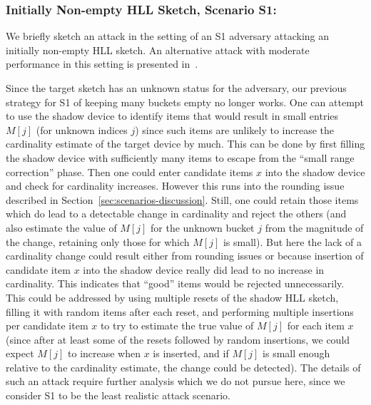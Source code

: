 \documentclass[sigconf, anonymous, dvipsnames]{acmart} %
\begin{document}
\subsubsection{Initially Non-empty HLL Sketch, Scenario S1:} 

We briefly sketch an attack in the setting of an S1 adversary attacking an initially non-empty HLL sketch. An alternative attack with moderate performance in this setting is presented in~\cite{hllvuln}.

Since the target sketch has an unknown status for the adversary, our previous strategy for S1 of keeping many buckets empty no longer works. One can attempt to use the shadow device to identify items that would result in small entries $M[j]$ (for unknown indices $j$) since such items are unlikely to increase the cardinality estimate of the target device by much.  This can be done by first filling the shadow device with sufficiently many items to escape from the ``small range correction'' phase. Then one could enter candidate items $x$ into the shadow device and check for cardinality increases. However this runs into the rounding issue described in Section~\ref{sec:scenarios-discussion}. Still, one could retain those items which do lead to a detectable change in cardinality and reject the others (and also estimate the value of $M[j]$ for the unknown bucket $j$ from the magnitude of the change, retaining only those for which $M[j]$ is small). But here the lack of a cardinality change could result either from rounding issues or because insertion of candidate item $x$ into the shadow device really did lead to no increase in cardinality. This indicates that  ``good'' items would be rejected unnecessarily. This could be addressed by using multiple resets of the shadow HLL sketch, filling it with random items after each reset, and performing multiple insertions per candidate item $x$ to try to estimate the true value of $M[j]$ for each item $x$ (since after at least some of the resets followed by random insertions, we could expect $M[j]$ to increase when $x$ is inserted, and if $M[j]$ is small enough relative to the cardinality estimate, the change could be detected). The details of such an attack require further analysis which we do not pursue here, since we consider S1 to be the least realistic attack scenario. 
\end{document}
